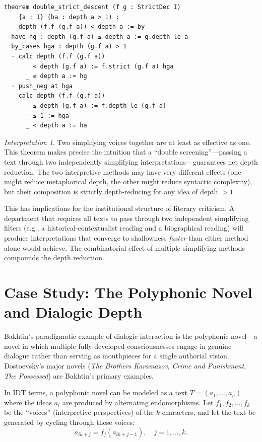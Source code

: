 \documentclass[11pt,openany]{book}
\theoremstyle{definition}
\theoremstyle{plain}
\theoremstyle{remark}
\newtheorem{interpretation}[axiom]{Interpretation}
\begin{document}
\begin{lstlisting}[language=Lean4]
theorem double_strict_descent (f g : StrictDec I)
    {a : I} (ha : depth a > 1) :
    depth (f.f (g.f a)) < depth a := by
  have hg : depth (g.f a) ≤ depth a := g.depth_le a
  by_cases hga : depth (g.f a) > 1
  · calc depth (f.f (g.f a))
        < depth (g.f a) := f.strict (g.f a) hga
      _ ≤ depth a := hg
  · push_neg at hga
    calc depth (f.f (g.f a))
        ≤ depth (g.f a) := f.depth_le (g.f a)
      _ ≤ 1 := hga
      _ < depth a := ha
\end{lstlisting}

\begin{interpretation}
Two simplifying voices together are at least as effective as one. This theorem makes precise the intuition that a ``double screening''---passing a text through two independently simplifying interpretations---guarantees net depth reduction. The two interpretive methods may have very different effects (one might reduce metaphorical depth, the other might reduce syntactic complexity), but their composition is strictly depth-reducing for any idea of depth $> 1$.

This has implications for the institutional structure of literary criticism. A department that requires all texts to pass through two independent simplifying filters (e.g., a historical-contextualist reading and a biographical reading) will produce interpretations that converge to shallowness \emph{faster} than either method alone would achieve. The combinatorial effect of multiple simplifying methods compounds the depth reduction.
\end{interpretation}

\section{Case Study: The Polyphonic Novel and Dialogic Depth}

Bakhtin's paradigmatic example of dialogic interaction is the polyphonic novel---a novel in which multiple fully-developed consciousnesses engage in genuine dialogue rather than serving as mouthpieces for a single authorial vision. Dostoevsky's major novels (\emph{The Brothers Karamazov}, \emph{Crime and Punishment}, \emph{The Possessed}) are Bakhtin's primary examples.

In IDT terms, a polyphonic novel can be modeled as a text $T = (a_1, \ldots, a_n)$ where the ideas $a_i$ are produced by alternating endomorphisms. Let $f_1, f_2, \ldots, f_k$ be the ``voices'' (interpretive perspectives) of the $k$ characters, and let the text be generated by cycling through these voices:
\[
a_{ik + j} = f_j(a_{ik + j - 1}), \quad j = 1, \ldots, k.
\]
\end{document}
